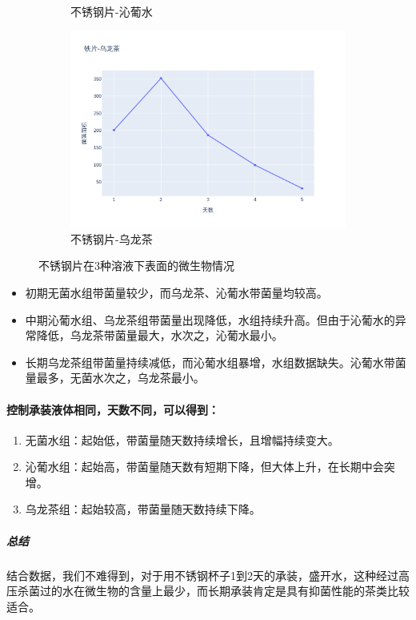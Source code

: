 \documentclass[12pt,a4paper]{ctexart}
\begin{document}
\begin{figure}[htbp]
\begin{subfigure}[b]{0.31\textwidth}
        \caption{不锈钢片-沁葡水}
        \label{subfig:2}
    \end{subfigure}
    \hfill  %
    \begin{subfigure}[b]{0.31\textwidth}
        \centering
        \includegraphics[width=\linewidth]{./plot/SingleMaterial/iron/铁片-乌龙茶_line.png}
        \caption{不锈钢片-乌龙茶}
        \label{subfig:3}
    \end{subfigure}
    \caption{不锈钢片在3种溶液下表面的微生物情况}
    \label{fig:triple_horizontal}  %
\end{figure}
\begin{itemize}
    \item 初期无菌水组带菌量较少，而乌龙茶、沁葡水带菌量均较高。
    \item 中期沁葡水组、乌龙茶组带菌量出现降低，水组持续升高。但由于沁葡水的异常降低，乌龙茶带菌量最大，水次之，沁葡水最小。
    \item 长期乌龙茶组带菌量持续减低，而沁葡水组暴增，水组数据缺失。沁葡水带菌量最多，无菌水次之，乌龙茶最小。
\end{itemize}







\paragraph{控制承装液体相同，天数不同，可以得到：}
\begin{enumerate}
    \item 无菌水组：起始低，带菌量随天数持续增长，且增幅持续变大。
    \item 沁葡水组：起始高，带菌量随天数有短期下降，但大体上升，在长期中会突增。
    \item 乌龙茶组：起始较高，带菌量随天数持续下降。
\end{enumerate}
\subparagraph{总结}
结合数据，我们不难得到，对于用不锈钢杯子1到2天的承装，盛开水，这种经过高压杀菌过的水在微生物的含量上最少，而长期承装肯定是具有抑菌性能的茶类比较适合。
\end{document}

